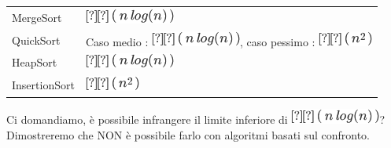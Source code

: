 \documentclass{article}
\begin{document}
\begin{longtable}[]{@{}ll@{}}
\toprule
\begin{minipage}[t]{0.47\columnwidth}\raggedright\strut
{MergeSort}\strut
\end{minipage} & \begin{minipage}[t]{0.47\columnwidth}\raggedright\strut
\includegraphics{images/image151.png}\strut
\end{minipage}\tabularnewline
\begin{minipage}[t]{0.47\columnwidth}\raggedright\strut
{QuickSort}\strut
\end{minipage} & \begin{minipage}[t]{0.47\columnwidth}\raggedright\strut
{Caso medio : }\includegraphics{images/image151.png}{, caso pessimo :
}\includegraphics{images/image152.png}\strut
\end{minipage}\tabularnewline
\begin{minipage}[t]{0.47\columnwidth}\raggedright\strut
{HeapSort}\strut
\end{minipage} & \begin{minipage}[t]{0.47\columnwidth}\raggedright\strut
\includegraphics{images/image151.png}\strut
\end{minipage}\tabularnewline
\begin{minipage}[t]{0.47\columnwidth}\raggedright\strut
{InsertionSort}\strut
\end{minipage} & \begin{minipage}[t]{0.47\columnwidth}\raggedright\strut
\includegraphics{images/image152.png}\strut
\end{minipage}\tabularnewline
\bottomrule
\end{longtable}

{}

{}

{Ci domandiamo, }{è possibile infrangere il limite inferiore di
}\includegraphics{images/image151.png}{? Dimostreremo che NON è
possibile farlo con algoritmi basati sul confronto.}
\end{document}
